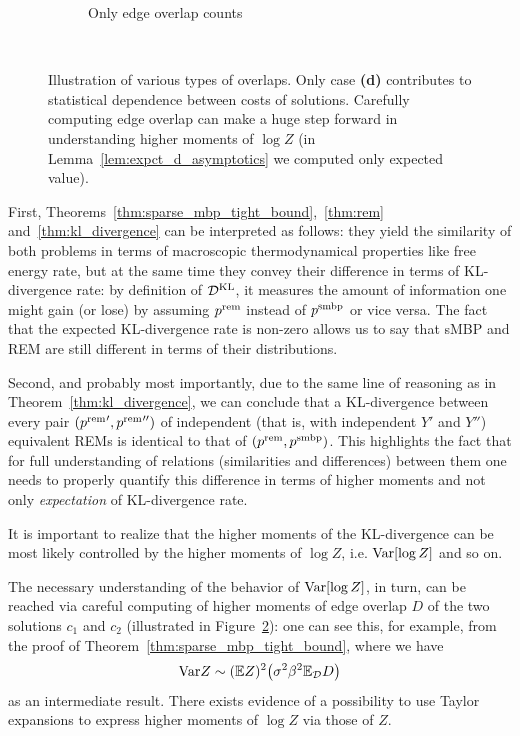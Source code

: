 \begin{figure}[th!]
\begin{subfigure}[b]{.48\textwidth}
      \caption{Only edge overlap counts}
      \label{fig:ch_rem_smbp_illustration-3}
  \end{subfigure}
  \\[.5cm]
  \caption{Illustration of various types of overlaps. Only case \textbf{(d)}
  contributes to statistical dependence between costs of solutions. Carefully
  computing edge overlap can make a huge step forward in understanding higher
  moments of $\log Z$ (in Lemma~\ref{lem:expct_d_asymptotics} we computed only
  expected value).}
  \label{fig:ch_rem_smbp_illustration}
\end{figure}

First, Theorems~\ref{thm:sparse_mbp_tight_bound},~\ref{thm:rem}
and~\ref{thm:kl_divergence} can be interpreted as follows: they yield the
similarity of both problems in terms of macroscopic thermodynamical properties
like free energy rate, but at the same time they convey their difference in
terms of KL-divergence rate: by definition of $\mathcal{D}^{\text{KL}}$, it measures the amount of
information one might gain (or lose) by assuming $p^{\mathrm{rem}}$ instead of $p^{\mathrm{smbp}}$ or
vice versa. The fact that the expected KL-divergence rate is non-zero allows us
to say that sMBP and REM are still different in terms of their distributions.

Second, and probably most importantly, due to the same line of reasoning as in
Theorem~\ref{thm:kl_divergence}, we can conclude that a KL-divergence between
every pair $({p^{\mathrm{rem}}}', {p^{\mathrm{rem}}}'')$ of independent (that is, with independent
$Y'$ and $Y''$) equivalent REMs is identical to that of $(p^{\mathrm{rem}}, p^{\mathrm{smbp}})$. This
highlights the fact that for full understanding of relations (similarities and
differences) between them one needs to properly quantify this difference in
terms of higher moments and not only \textit{expectation} of KL-divergence rate.

It is important to realize that the higher moments of the KL-divergence can be
most likely controlled by the higher moments of $\log Z$, i.e. ${\mathrm{Var}}[\log Z]$
and so on. 

The necessary understanding of the behavior of ${\mathrm{Var}}[\log Z]$, in turn, can be
reached via careful computing of higher moments of edge overlap $D$ of the two
solutions $c_1$ and $c_2$ (illustrated in
Figure~\ref{fig:ch_rem_smbp_illustration}): one can see this, for example,
from the proof of Theorem~\ref{thm:sparse_mbp_tight_bound}, where we have 
\begin{equation*}
  {\mathrm{Var}} Z \sim (\mathbb{E} Z)^2 \bigl( \sigma^2 \beta^2 \mathbb{E}_{\cal D} D \bigr)
\end{equation*}
as an intermediate result. There exists evidence of a possibility to use 
Taylor expansions to express higher moments of $\log Z$ via those of $Z$.

